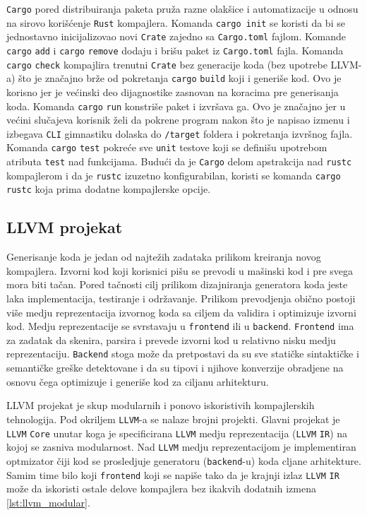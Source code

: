 \documentclass[11pt]{article}
\begin{document}
\verb|Cargo| pored distribuiranja paketa pruža razne olakšice i automatizacije u odnosu na sirovo korišćenje \verb|Rust| kompajlera. 
Komanda \verb|cargo init| se koristi da bi se jednostavno inicijalizovao novi \verb|Crate| zajedno sa \verb|Cargo.toml| fajlom. 
Komande \verb|cargo| \verb|add| i \verb|cargo| \verb|remove| dodaju i brišu paket iz \verb|Cargo.toml| fajla.
Komanda \verb|cargo| \verb|check| kompajlira trenutni \verb|Crate| bez generacije koda (bez upotrebe LLVM-a) što je značajno brže 
od pokretanja \verb|cargo| \verb|build| koji i generiše kod. Ovo je korisno jer je većinski deo dijagnostike zasnovan 
na koracima pre generisanja koda. Komanda \verb|cargo| \verb|run| konstriše paket i izvršava ga. Ovo je značajno jer u većini slučajeva korisnik želi da pokrene program nakon što je 
napisao izmenu i izbegava \verb|CLI| gimnastiku dolaska do \verb|/target| foldera i pokretanja izvršnog fajla. 
Komanda \verb|cargo| \verb|test| pokreće sve \verb|unit| testove koji se definišu upotrebom atributa \verb|test| nad funkcijama.
Budući da je \verb|Cargo| delom apstrakcija nad \verb|rustc| kompajlerom i da je \verb|rustc| izuzetno konfigurabilan, koristi se komanda \verb|cargo| \verb|rustc|
koja prima dodatne kompajlerske opcije.

\newpage

\subsection{LLVM projekat}

Generisanje koda je jedan od najtežih zadataka prilikom kreiranja novog kompajlera. Izvorni kod koji 
korisnici pišu se prevodi u mašinski kod i pre svega mora biti tačan. Pored tačnosti cilj prilikom 
dizajniranja generatora koda jeste laka implementacija, testiranje i održavanje.
Prilikom prevodjenja obično postoji 
više medju reprezentacija izvornog koda sa ciljem da validira i optimizuje izvorni kod. Medju reprezentacije 
se svrstavaju u \verb|frontend| ili u \verb|backend|. \verb|Frontend| ima za zadatak da skenira, parsira 
i prevede izvorni kod u relativno nisku medju reprezentaciju. \verb|Backend| stoga može da pretpostavi 
da su sve statičke sintaktičke i semantičke greške detektovane i da su tipovi i njihove konverzije
obradjene na osnovu čega optimizuje i generiše kod za ciljanu arhitekturu.

LLVM projekat je skup modularnih i ponovo iskoristivih kompajlerskih tehnologija. Pod okriljem \verb|LLVM|-a
se nalaze brojni projekti. Glavni projekat je \verb|LLVM| \verb|Core| unutar koga je specificirana \verb|LLVM|
medju reprezentacija (\verb|LLVM| \verb|IR|) na kojoj se zasniva modularnost. Nad \verb|LLVM| medju reprezentacijom
je implementiran optmizator čiji kod se prosledjuje generatoru (\verb|backend|-u) koda cljane arhitekture. Samim time 
bilo koji \verb|frontend| koji se napiše tako da je krajnji izlaz \verb|LLVM| \verb|IR| može da iskoristi 
ostale delove kompajlera bez ikakvih dodatnih izmena \ref{lst:llvm_modular}.
\end{document}
